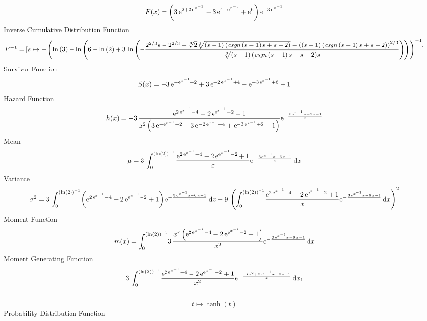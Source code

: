 \documentclass[12pt]{article}
\begin{document}
 $$F(x)= \left( 3\,{{\rm e}^{2+2\,{{\rm e}^{{x}^{-1}}}}}-3\,{{\rm e}^{4+{
{\rm e}^{{x}^{-1}}}}}+{{\rm e}^{6}} \right) {{\rm e}^{-3\,{{\rm e}^{{x
}^{-1}}}}}
$$ Inverse Cumulative Distribution Function 
  $$F^{-1} = [s\mapsto - \left( \ln  \left( 3 \right) -\ln  \left( 6-\ln  \left( 2
 \right) +3\,\ln  \left( -{\frac {{2}^{2/3}s-{2}^{2/3}-\sqrt [3]{2}
\sqrt [3]{ \left( s-1 \right)  \left( {\it csgn} \left( s-1 \right) s+
s-2 \right) }- \left(  \left( s-1 \right)  \left( {\it csgn} \left( s-
1 \right) s+s-2 \right)  \right) ^{2/3}}{\sqrt [3]{ \left( s-1
 \right)  \left( {\it csgn} \left( s-1 \right) s+s-2 \right) }s}}
 \right)  \right)  \right) ^{-1}]
$$Survivor Function 
 $$ S(x)=-3\,{{\rm e}^{-{{\rm e}^{{x}^{-1}}}+2}}+3\,{{\rm e}^{-2\,{{\rm e}^{{x}
^{-1}}}+4}}-{{\rm e}^{-3\,{{\rm e}^{{x}^{-1}}}+6}}+1
$$ Hazard Function 
 $$ h(x)=-3\,{\frac {{{\rm e}^{2\,{{\rm e}^{{x}^{-1}}}-4}}-2\,{{\rm e}^{{
{\rm e}^{{x}^{-1}}}-2}}+1}{{x}^{2} \left( 3\,{{\rm e}^{-{{\rm e}^{{x}^
{-1}}}+2}}-3\,{{\rm e}^{-2\,{{\rm e}^{{x}^{-1}}}+4}}+{{\rm e}^{-3\,{
{\rm e}^{{x}^{-1}}}+6}}-1 \right) }{{\rm e}^{-{\frac {3\,{{\rm e}^{{x}
^{-1}}}x-6\,x-1}{x}}}}}
$$Mean 
 $$ \mu=3\,\int_{0}^{ \left( \ln  \left( 2 \right)  \right) ^{-1}}\!{\frac {{
{\rm e}^{2\,{{\rm e}^{{x}^{-1}}}-4}}-2\,{{\rm e}^{{{\rm e}^{{x}^{-1}}}
-2}}+1}{x}{{\rm e}^{-{\frac {3\,{{\rm e}^{{x}^{-1}}}x-6\,x-1}{x}}}}}
\,{\rm d}x
$$ Variance 
 $$ \sigma^2 = 3\,\int_{0}^{ \left( \ln  \left( 2 \right)  \right) ^{-1}}\! \left( {
{\rm e}^{2\,{{\rm e}^{{x}^{-1}}}-4}}-2\,{{\rm e}^{{{\rm e}^{{x}^{-1}}}
-2}}+1 \right) {{\rm e}^{-{\frac {3\,{{\rm e}^{{x}^{-1}}}x-6\,x-1}{x}}
}}\,{\rm d}x-9\, \left( \int_{0}^{ \left( \ln  \left( 2 \right) 
 \right) ^{-1}}\!{\frac {{{\rm e}^{2\,{{\rm e}^{{x}^{-1}}}-4}}-2\,{
{\rm e}^{{{\rm e}^{{x}^{-1}}}-2}}+1}{x}{{\rm e}^{-{\frac {3\,{{\rm e}^
{{x}^{-1}}}x-6\,x-1}{x}}}}}\,{\rm d}x \right) ^{2}
$$Moment Function 
 $$ m(x) = \int_{0}^{ \left( \ln  \left( 2 \right)  \right) ^{-1}}\!3\,{\frac {{x
}^{r} \left( {{\rm e}^{2\,{{\rm e}^{{x}^{-1}}}-4}}-2\,{{\rm e}^{{
{\rm e}^{{x}^{-1}}}-2}}+1 \right) }{{x}^{2}}{{\rm e}^{-{\frac {3\,{
{\rm e}^{{x}^{-1}}}x-6\,x-1}{x}}}}}\,{\rm d}x
$$ Moment Generating Function 
 $$3\,\int_{0}^{ \left( \ln  \left( 2 \right)  \right) ^{-1}}\!{\frac {{
{\rm e}^{2\,{{\rm e}^{{x}^{-1}}}-4}}-2\,{{\rm e}^{{{\rm e}^{{x}^{-1}}}
-2}}+1}{{x}^{2}}{{\rm e}^{-{\frac {-t{x}^{2}+3\,{{\rm e}^{{x}^{-1}}}x-
6\,x-1}{x}}}}}\,{\rm d}x_{{1}}
$$-------------------------------------------------------------------------------------------  \\$$t\mapsto \tanh \left( t \right) 
$$Probability Distribution Function 
\end{document}
